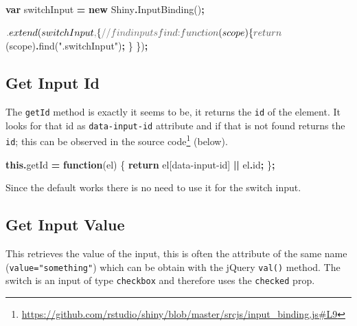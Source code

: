 \documentclass[
]{krantz}
\makeatletter
\newenvironment{Shaded}{\begin{snugshade}}{\end{snugshade}}
\newcommand{\AttributeTok}[1]{\textcolor[rgb]{0.61,0.61,0.61}{#1}}
\newcommand{\CommentTok}[1]{\textcolor[rgb]{0.37,0.37,0.37}{\textit{#1}}}
\newcommand{\ControlFlowTok}[1]{\textcolor[rgb]{0.27,0.27,0.27}{\textbf{#1}}}
\newcommand{\DataTypeTok}[1]{\textcolor[rgb]{0.27,0.27,0.27}{#1}}
\newcommand{\FunctionTok}[1]{\textcolor[rgb]{0,0,0}{#1}}
\newcommand{\KeywordTok}[1]{\textcolor[rgb]{0.27,0.27,0.27}{\textbf{#1}}}
\newcommand{\NormalTok}[1]{#1}
\newcommand{\OperatorTok}[1]{\textcolor[rgb]{0.43,0.43,0.43}{\textbf{#1}}}
\newcommand{\StringTok}[1]{\textcolor[rgb]{0.5,0.5,0.5}{#1}}
\renewcommand{\href}[2]{#2\footnote{\url{#1}}}
\newenvironment{kframe}{%
\medskip{}
\setlength{\fboxsep}{.8em}
 \def\at@end@of@kframe{}%
 \ifinner\ifhmode%
  \def\at@end@of@kframe{\end{minipage}}%
  \begin{minipage}{\columnwidth}%
 \fi\fi%
 \def\FrameCommand##1{\hskip\@totalleftmargin \hskip-\fboxsep
 \colorbox{shadecolor}{##1}\hskip-\fboxsep
     \hskip-\linewidth \hskip-\@totalleftmargin \hskip\columnwidth}%
 \MakeFramed {\advance\hsize-\width
   \@totalleftmargin\z@ \linewidth\hsize
   \@setminipage}}%
 {\par\unskip\endMakeFramed%
 \at@end@of@kframe}
\renewenvironment{Shaded}{\begin{kframe}}{\end{kframe}}
\makeatother
\begin{document}
\begin{Shaded}
\begin{Highlighting}[]
\KeywordTok{var}\NormalTok{ switchInput }\OperatorTok{=} \KeywordTok{new}\NormalTok{ Shiny}\OperatorTok{.}\FunctionTok{InputBinding}\NormalTok{()}\OperatorTok{;}

\NormalTok{$}\OperatorTok{.}\FunctionTok{extend}\NormalTok{(switchInput}\OperatorTok{,}\NormalTok{ \{}
  \CommentTok{// find inputs}
  \DataTypeTok{find}\OperatorTok{:} \KeywordTok{function}\NormalTok{(scope) \{}
    \ControlFlowTok{return}\NormalTok{ $(scope)}\OperatorTok{.}\FunctionTok{find}\NormalTok{(}\StringTok{".switchInput"}\NormalTok{)}\OperatorTok{;}
\NormalTok{  \}}
\NormalTok{\})}\OperatorTok{;}
\end{Highlighting}
\end{Shaded}

\hypertarget{shiny-input-get-id}{%
\subsection{Get Input Id}\label{shiny-input-get-id}}

The \texttt{getId} method is exactly it seems to be, it returns the \texttt{id} of the element. It looks for that id as \texttt{data-input-id} attribute and if that is not found returns the \texttt{id}; this can be observed in the \href{https://github.com/rstudio/shiny/blob/master/srcjs/input_binding.js\#L9}{source code} (below).

\begin{Shaded}
\begin{Highlighting}[]
\KeywordTok{this}\OperatorTok{.}\AttributeTok{getId} \OperatorTok{=} \KeywordTok{function}\NormalTok{(el) \{}
  \ControlFlowTok{return}\NormalTok{ el[}\StringTok{\textquotesingle{}data{-}input{-}id\textquotesingle{}}\NormalTok{] }\OperatorTok{||}\NormalTok{ el}\OperatorTok{.}\AttributeTok{id}\OperatorTok{;}
\NormalTok{\}}\OperatorTok{;}
\end{Highlighting}
\end{Shaded}

Since the default works there is no need to use it for the switch input.

\hypertarget{shiny-input-get-value}{%
\subsection{Get Input Value}\label{shiny-input-get-value}}

This retrieves the value of the input, this is often the attribute of the same name (\texttt{value="something"}) which can be obtain with the jQuery \texttt{val()} method. The switch is an input of type \texttt{checkbox} and therefore uses the \texttt{checked} prop.
\end{document}
